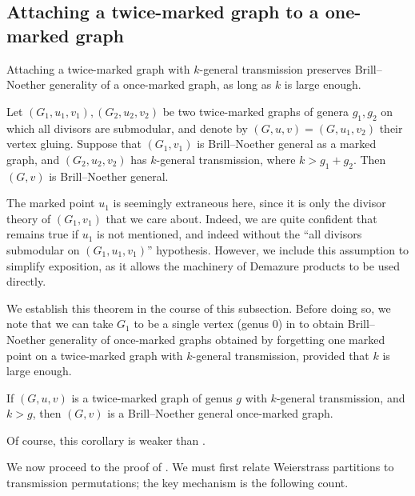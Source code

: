 \subsection{Attaching a twice-marked graph to a one-marked graph}

Attaching a twice-marked graph with $k$-general transmission preserves Brill--Noether generality of a once-marked graph, as long as $k$ is large enough.

\begin{theorem}\label{thm:glueBNGtoKGT}
Let $(G_1, u_1, v_1), (G_2, u_2, v_2)$ be two twice-marked graphs of genera $g_1,g_2$ on which all divisors are submodular, and denote by $(G,u,v) = (G, u_1, v_2)$ their vertex gluing.
Suppose that $(G_1,v_1)$ is Brill--Noether general as a marked graph, and $(G_2, u_2,v_2)$ has $k$-general transmission, where $k > g_1 + g_2$. Then $(G,v)$ is Brill--Noether general.
\end{theorem}

\begin{rema}
The marked point $u_1$ is seemingly extraneous here, since it is only the divisor theory of $(G_1,v_1)$ that we care about. Indeed, we are quite confident that  remains true if $u_1$ is not mentioned, and indeed without the ``all divisors submodular on $(G_1,u_1,v_1)$'' hypothesis. However, we include this assumption to simplify exposition, as it allows the machinery of Demazure products to be used directly.
\end{rema}

We establish this theorem in the course of this subsection. Before doing so, we note that we can take $G_1$ to be a single vertex (genus $0$) in  to obtain Brill--Noether generality of once-marked graphs obtained by forgetting one marked point on a twice-marked graph with $k$-general transmission, provided that $k$ is large enough.

\begin{coro}
If $(G,u,v)$ is a twice-marked graph of genus $g$ with $k$-general transmission, and $k > g$, then $(G,v)$ is a Brill--Noether general once-marked graph.
\end{coro}

Of course, this corollary is weaker than .

We now proceed to the proof of . We must first relate Weierstrass partitions to transmission permutations; the key mechanism is the following count.

